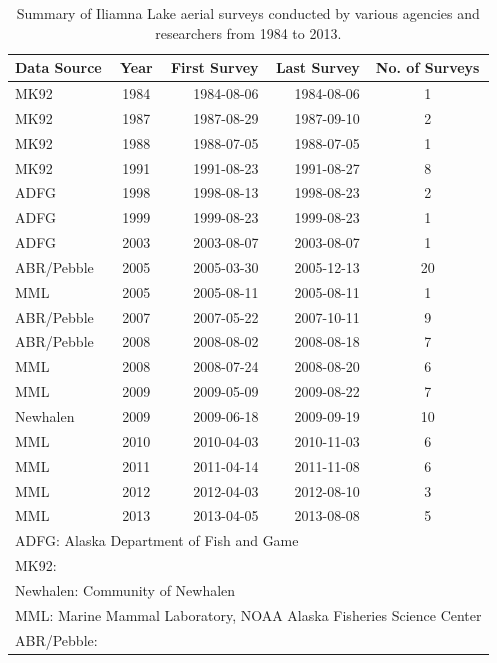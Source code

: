 \documentclass[12pt, titlepage]{article}\usepackage[]{graphicx}\usepackage[]{color}
\begin{document}
\begin{table}[ht] 
  \caption{Summary of Iliamna Lake aerial surveys conducted by various agencies and researchers from 1984 to 2013. \label{tab:surveys}}
\centering
\begin{tabular*}{\columnwidth}{@{}l@{\extracolsep{\fill}}c@{\extracolsep{\fill}}r@{\extracolsep{\fill}}r@{\extracolsep{\fill}}c@{}}
  \hline
  \hline
Data Source & Year & First Survey & Last Survey & No. of Surveys \\ 
  \hline
\hline
MK92 & 1984 & 1984-08-06 & 1984-08-06 &   1 \\ 
  MK92 & 1987 & 1987-08-29 & 1987-09-10 &   2 \\ 
  MK92 & 1988 & 1988-07-05 & 1988-07-05 &   1 \\ 
  MK92 & 1991 & 1991-08-23 & 1991-08-27 &   8 \\ 
  ADFG & 1998 & 1998-08-13 & 1998-08-23 &   2 \\ 
  ADFG & 1999 & 1999-08-23 & 1999-08-23 &   1 \\ 
  ADFG & 2003 & 2003-08-07 & 2003-08-07 &   1 \\ 
  ABR/Pebble & 2005 & 2005-03-30 & 2005-12-13 &  20 \\ 
  MML & 2005 & 2005-08-11 & 2005-08-11 &   1 \\ 
  ABR/Pebble & 2007 & 2007-05-22 & 2007-10-11 &   9 \\ 
  ABR/Pebble & 2008 & 2008-08-02 & 2008-08-18 &   7 \\ 
  MML & 2008 & 2008-07-24 & 2008-08-20 &   6 \\ 
  MML & 2009 & 2009-05-09 & 2009-08-22 &   7 \\ 
  Newhalen & 2009 & 2009-06-18 & 2009-09-19 &  10 \\ 
  MML & 2010 & 2010-04-03 & 2010-11-03 &   6 \\ 
  MML & 2011 & 2011-04-14 & 2011-11-08 &   6 \\ 
  MML & 2012 & 2012-04-03 & 2012-08-10 &   3 \\ 
  MML & 2013 & 2013-04-05 & 2013-08-08 &   5 \\ 
   \hline

\multicolumn{5}{l}{ADFG: Alaska Department of Fish and Game} \\
\multicolumn{5}{l}{MK92: \citet{Math:Klin:harb:1992}} \\
\multicolumn{5}{l}{Newhalen: Community of Newhalen} \\
\multicolumn{5}{l}{MML: Marine Mammal Laboratory, NOAA Alaska Fisheries Science Center} \\
\multicolumn{5}{l}{ABR/Pebble: \citet{ABR:wild:2011}}
\end{tabular*}
\end{table}
\end{document}
